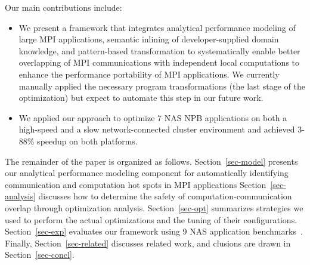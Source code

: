 Our main contributions include:
\begin{itemize}
 \item We present a framework that integrates analytical performance modeling of large MPI applications, semantic inlining of developer-supplied domain knowledge, and pattern-based transformation to systematically enable better overlapping of MPI communications with independent local computations to enhance the performance portability of MPI applications. We currently manually applied the necessary program transformations (the last stage of the optimization) but expect to automate this step in our future work. 
 \item We applied our approach to optimize 7 NAS NPB applications on both a high-speed and a slow network-connected cluster environment and achieved 3-88\% speedup on both platforms.
\end{itemize}


The remainder of the paper is organized as follows.
Section~\ref{sec-model} presents our analytical performance modeling component for automatically identifying communication and computation hot spots in MPI applications
Section~\ref{sec-analysis} discusses how to determine the safety of computation-communication overlap through optimization analysis.
Section~\ref{sec-opt} summarizes strategies we used to perform the actual optimizations and the tuning of their configurations.
Section~\ref{sec-exp} evaluates our framework using 9 NAS application benchmarks~\cite{npb}.
Finally, Section~\ref{sec-related} discusses related work, and clusions are drawn in
Section~\ref{sec-concl}.


